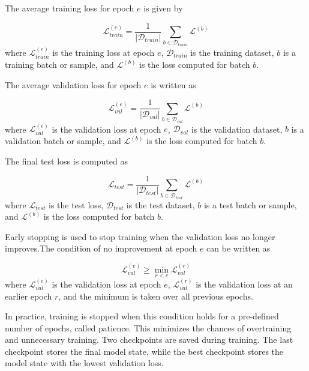 The average training loss for epoch \(e\) is given by

\begin{equation}
\mathcal{L}_{train}^{(e)}
=
\frac{1}{|\mathcal{D}_{train}|}
\sum_{b \in \mathcal{D}_{train}}
\mathcal{L}^{(b)}
\end{equation}
where \(\mathcal{L}_{train}^{(e)}\) is the training loss at epoch \(e\), \(\mathcal{D}_{train}\) is the training dataset, \(b\) is a training batch or sample, and \(\mathcal{L}^{(b)}\) is the loss computed for batch \(b\).

The average validation loss for epoch \(e\) is written as

\begin{equation}
\mathcal{L}_{val}^{(e)}
=
\frac{1}{|\mathcal{D}_{val}|}
\sum_{b \in \mathcal{D}_{val}}
\mathcal{L}^{(b)}
\end{equation}
where \(\mathcal{L}_{val}^{(e)}\) is the validation loss at epoch \(e\), \(\mathcal{D}_{val}\) is the validation dataset, \(b\) is a validation batch or sample, and \(\mathcal{L}^{(b)}\) is the loss computed for batch \(b\).

The final test loss is computed as

\begin{equation}
\mathcal{L}_{test}
=
\frac{1}{|\mathcal{D}_{test}|}
\sum_{b \in \mathcal{D}_{test}}
\mathcal{L}^{(b)}
\end{equation}
where \(\mathcal{L}_{test}\) is the test loss, \(\mathcal{D}_{test}\) is the test dataset, \(b\) is a test batch or sample, and \(\mathcal{L}^{(b)}\) is the loss computed for batch \(b\).

Early stopping is used to stop training when the validation loss no longer improves.The condition of no improvement at epoch \(e\) can be written as

\begin{equation}
\mathcal{L}_{val}^{(e)}
\geq
\min_{r < e}
\mathcal{L}_{val}^{(r)}
\end{equation}
where \(\mathcal{L}_{val}^{(e)}\) is the validation loss at epoch \(e\), \(\mathcal{L}_{val}^{(r)}\)  is the validation loss at an earlier epoch \(r\), and the minimum is taken over all previous epochs.

In practice, training is stopped when this condition holds for a pre-defined number of epochs, called patience. This minimizes the chances of overtraining and unnecessary training. Two checkpoints are saved during training. The last checkpoint stores the final model state, while the best checkpoint stores the model state with the lowest validation loss.

